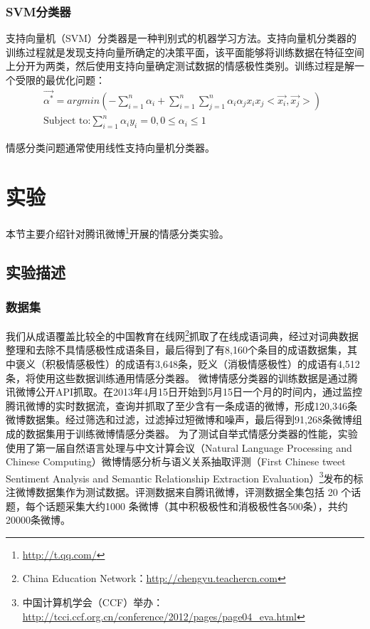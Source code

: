 \subsubsection{SVM分类器}
\label{svm}
支持向量机（SVM）分类器是一种判别式的机器学习方法。支持向量机分类器的训练过程就是发现支持向量所确定的决策平面，该平面能够将训练数据在特征空间上分开为两类，然后使用支持向量确定测试数据的情感极性类别。训练过程是解一个受限的最优化问题：
\begin{equation}
\label{e7}
\begin{aligned}
\overrightarrow{\alpha^{\ast}}=argmin \left( -\sum_{i=1}^{n}\alpha_{i} + \sum_{i=1}^{n} \sum_{j=1}^{n}\alpha_{i}\alpha_{j} x_{i}x_{j}<\overrightarrow{x_{i}},\overrightarrow{x_{j}}> \right)\\
\mbox{Subject to:} \sum_{i=1}^{n}\alpha_{i}y_{i}=0 , 0\leqslant \alpha_{i} \leqslant 1
\end{aligned} \enspace
\end{equation}

情感分类问题通常使用线性支持向量机分类器。

\section{实验}
\label{experiment}
本节主要介绍针对腾讯微博\footnote{\url{http://t.qq.com/}}开展的情感分类实验。

\subsection{实验描述}
\label{description}

\subsubsection{数据集}
我们从成语覆盖比较全的中国教育在线网\footnote{China Education Network：\url{http://chengyu.teachercn.com}}抓取了在线成语词典，经过对词典数据整理和去除不具情感极性成语条目，最后得到了有8,160个条目的成语数据集，其中褒义（积极情感极性）的成语有3,648条，贬义（消极情感极性）的成语有4,512条，将使用这些数据训练通用情感分类器。
微博情感分类器的训练数据是通过腾讯微博公开API抓取。在2013年4月15日开始到5月15日一个月的时间内，通过监控腾讯微博的实时数据流，查询并抓取了至少含有一条成语的微博，形成120,346条微博数据集。经过筛选和过滤，过滤掉过短微博和噪声，最后得到91,268条微博组成的数据集用于训练微博情感分类器。
为了测试自举式情感分类器的性能，实验使用了第一届自然语言处理与中文计算会议（Natural Language Processing and Chinese Computing）微博情感分析与语义关系抽取评测（First Chinese tweet Sentiment Analysis and Semantic Relationship Extraction Evaluation）\footnote{中国计算机学会（CCF）举办：\url{http://tcci.ccf.org.cn/conference/2012/pages/page04_eva.html}}发布的标注微博数据集作为测试数据。评测数据来自腾讯微博，评测数据全集包括 20 个话题，每个话题采集大约1000
条微博（其中积极极性和消极极性各500条），共约20000条微博。
 
